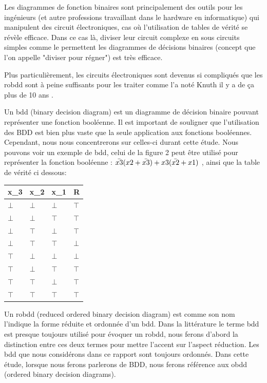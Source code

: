 \documentclass[french]{article}
\begin{document}
Les diagrammes de fonction binaires sont principalement des outils pour les ingénieurs (et autre professions travaillant dans le hardware en informatique) qui manipulent des circuit électroniques, cas où l'utilisation de tables de vérité se révèle efficace. Dans ce cas là, diviser leur circuit complexe en sous circuits simples comme le permettent les diagrammes de décisions binaires (concept que l'on appelle "diviser pour régner") est très efficace.\medskip

Plus particulièrement, les circuits électroniques sont devenus si compliqués que les robdd sont à peine suffisants pour les traiter comme l'a noté Knuth il y a de ça plus de 10 ans \cite{knuth}. \medskip

Un bdd (binary decision diagram) est un diagramme de décision binaire pouvant représenter une fonction booléenne. Il est important de souligner que l'utilisation des BDD est bien plus vaste que la seule application aux fonctions booléennes. Cependant, nous nous concentrerons sur celles-ci durant cette étude. Nous pouvons voir un exemple de bdd, celui de la figure 2 peut être utilisé pour représenter la fonction booléenne : \(\Bar{x3}(x2+\Bar{x3})+x3(\Bar{x2}+x1)\) , ainsi que la table de vérité ci dessous:
\vspace{5mm} 

\begin{tabular}{llll}
  \hline
  x_3 & x_2 & x_1 & R \\
 \hline
  $\bot$ & $\bot$ & $\bot$ & $\top$ \\
  $\bot$ & $\bot$ & $\top$ & $\top$ \\
  $\bot$ & $\top$ & $\bot$ & $\top$ \\
  $\bot$ & $\top$ & $\top$ & $\bot$ \\
  $\top$ & $\bot$ & $\bot$ & $\bot$ \\
  $\top$ & $\bot$ & $\top$ & $\top$ \\
  $\top$ & $\top$ & $\bot$ & $\top$ \\
  $\top$ & $\top$ & $\top$ & $\top$ \\
  \hline
\end{tabular}
\vspace{5mm} 

Un robdd (reduced ordered binary decision diagram) est comme son nom l'indique la forme réduite et ordonnée d'un bdd. Dans la littérature le terme bdd est presque toujours utilisé pour évoquer un robdd, nous ferons d'abord la distinction entre ces deux termes pour mettre l'accent sur l'aspect réduction. Les bdd que nous considérons dans ce rapport sont toujours ordonnés. Dans cette étude, lorsque nous ferons parlerons de BDD, nous ferons référence aux obdd  (ordered binary decision diagrams).\medskip
\end{document}
